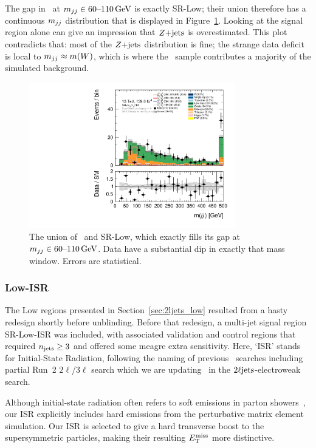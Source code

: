 The gap in \crz\ at $\mjj \in 60\textrm{--}110\,\eV[G]$ is exactly SR-Low;
their union therefore has a continuous $\mjj$ distribution that is displayed
in Figure~\ref{fig:2ljets_low_sr_or_cr_region}.
Looking at the signal region alone can give an impression that $\zjets$ is
overestimated.
This plot contradicts that: most of the $\zjets$ distribution is fine;
the strange data deficit is local to $\mjj \approx m(W)$, which is where the
\diboson\ sample contributes a majority of the simulated background.

\begin{figure}[tp]
\centering
\includegraphics[width=0.8\textwidth]{figures/2ljets_low_mjj_SRLow_or_CRZ.pdf}
\caption[
The union of CR-Z and SR-Low
]{%
The union of \crz\ and SR-Low, which exactly fills its gap at
$\mjj \in 60\textrm{--}110\,\eV[G]$.
Data have a substantial dip in exactly that mass window.
Errors are statistical.
}
\label{fig:2ljets_low_sr_or_cr_region}
\end{figure}


\subsubsection{Low-ISR}
\label{sec:2ljets_low_isr}
The Low regions presented in Section~\ref{sec:2ljets_low} resulted from a
hasty redesign shortly before unblinding.
Before that redesign, a multi-jet signal region SR-Low-ISR was included,
with associated validation and control regions
that required $\njet \geq 3$ and offered some meagre extra sensitivity.
Here, `ISR' stands for Initial-State Radiation, following the naming
of previous \atlas\ searches including partial Run~2 $2\ell$/$3\ell$
search which we are updating~\cite{atlas_23l_SUSY_2016_24} in the
$\twoljets$-electroweak search.

Although initial-state radiation often refers to soft emissions in
parton showers~\cite{corcella2000initial, bewick2022initial},
our ISR explicitly includes hard emissions from the perturbative matrix element
simulation.
Our ISR is selected to give a hard transverse boost to the supersymmetric
particles, making their resulting $\met$ more distinctive.


